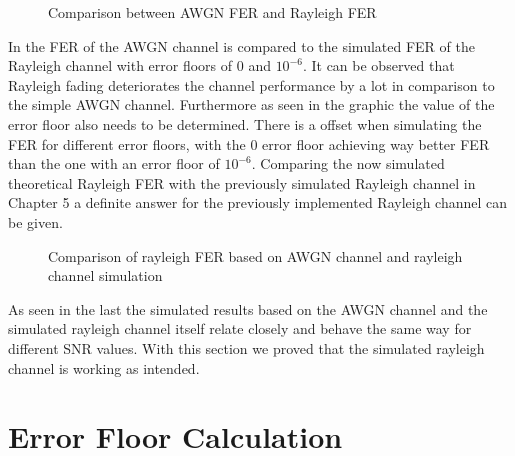 \begin{figure}[!h]
	\setlength{}
	\setlength\fheight{0.4\textheight}
	\centering
	
	\caption{Comparison between AWGN FER and Rayleigh FER}
	\label{fig:FERAWGNRAY}
\end{figure}
\newpage
In  the \gls{FER} of the AWGN channel is compared to the simulated \gls{FER} of the Rayleigh channel with error floors of $0$ and $10^{-6}$. It can be observed that Rayleigh fading deteriorates the channel performance by a lot in comparison to the simple AWGN channel. Furthermore as seen in the graphic the value of the error floor also needs to be determined. There is a offset when simulating the \gls{FER} for different error floors, with the 0 error floor achieving way better \gls{FER} than the one with an error floor of $10^{-6}$. Comparing the now simulated theoretical Rayleigh \gls{FER} with the previously simulated Rayleigh channel in Chapter 5 a definite answer for the previously implemented Rayleigh channel can be given.
\newpage
\begin{figure}[!htb]
	\setlength{}
	\setlength\fheight{0.4\textheight}
	\centering
	
	\caption{Comparison of rayleigh FER based on AWGN channel and rayleigh channel simulation}
	\label{fig:AWGNRAYCOMP}
\end{figure}
As seen in the last  the simulated results based on the AWGN channel and the simulated rayleigh channel itself relate closely and behave the same way for different \gls{SNR} values. With this section we proved that the simulated rayleigh channel is working as intended. 

\clearpage

\section{Error Floor Calculation}
\label{sec:ErrorFloor}

